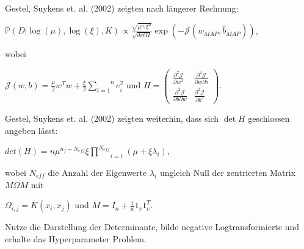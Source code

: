 \documentclass{beamer}
\begin{document}
{\begin{frame}

\end{frame}


\begin{frame}
Gestel, Suykens et. al. (2002) zeigten nach längerer Rechnung:

\begin{center}
$\mathbb{P}(D\vert \log(\mu),\log(\xi),K) \propto \frac{\sqrt{\mu^{n_f} \xi^n}}{\sqrt{det H}} \exp(- \mathcal{J}(\hat{w}_{MAP},\hat{b}_{MAP}))$,
\end{center}

wobei 
\begin{center}
	$\mathcal{J}(w,b) = \frac{\mu}{2}w^T w + \frac{\xi}{2}\overset{n}{\underset{i=1}			{\sum}} e_i ^2 \text{ und } H = \begin{pmatrix}
	\frac{\partial^2 \mathcal{J}}{\partial w^2 } & \frac{\partial^2 \mathcal{J}}				{\partial w \partial b } \\
	\frac{\partial^2 \mathcal{J}}{\partial b \partial w } & \frac{\partial^2 					\mathcal{J}}{\partial b^2 }
	\end{pmatrix}.$
\end{center}
\end{frame}


\begin{frame}

Gestel, Suykens et. al. (2002) zeigten weiterhin, dass sich $\det H $ geschlossen angeben lässt:

\begin{center}
$det(H) = n \mu^{n_f - N_{eff}} \xi \underset{i=1}{\overset{N_{eff}}{\prod}}(\mu + \xi \lambda_i)$,
\end{center}

wobei $N_{eff}$ die Anzahl der Eigenwerte $\lambda_i$ ungleich Null der zentrierten Matrix $M \Omega M$ mit
\begin{center}
$\Omega_{i,j} = K(x_i, x_j)$ und $M = I_n + \frac{1}{n} 1_v 1_v^T$.
\end{center}
\pause
Nutze die Darstellung der Determinante, bilde negative Logtransformierte und erhalte das Hyperparameter Problem.
\end{frame}


}
\end{document}
